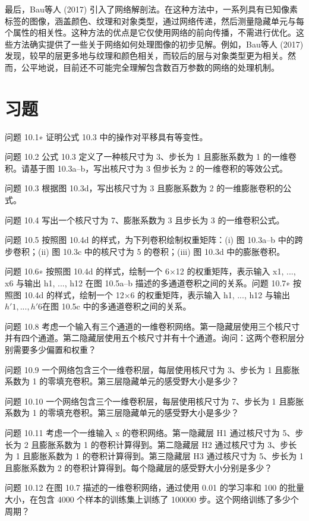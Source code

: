 \documentclass[lang=cn,newtx,10pt,scheme=chinese]{elegantbook}
\begin{document}
最后，Bau等人 (2017) 引入了网络解剖法。在这种方法中，一系列具有已知像素标签的图像，涵盖颜色、纹理和对象类型，通过网络传递，然后测量隐藏单元与每个属性的相关性。这种方法的优点是它仅使用网络的前向传播，不需进行优化。这些方法确实提供了一些关于网络如何处理图像的初步见解。例如，Bau等人 (2017) 发现，较早的层更多地与纹理和颜色相关，而较后的层与对象类型更为相关。然而，公平地说，目前还不可能完全理解包含数百万参数的网络的处理机制。
\section{习题}  
问题 10.1∗ 证明公式 10.3 中的操作对平移具有等变性。

问题 10.2 公式 10.3 定义了一种核尺寸为 3、步长为 1 且膨胀系数为 1 的一维卷积。请基于图 10.3a–b，写出核尺寸为 3 但步长为 2 的一维卷积的等效公式。

问题 10.3 根据图 10.3d，写出核尺寸为 3 且膨胀系数为 2 的一维膨胀卷积的公式。

问题 10.4 写出一个核尺寸为 7、膨胀系数为 3 且步长为 3 的一维卷积公式。

问题 10.5 按照图 10.4d 的样式，为下列卷积绘制权重矩阵：(i) 图 10.3a–b 中的跨步卷积；(ii) 图 10.3c 中的核尺寸为 5 的卷积；(iii) 图 10.3d 中的膨胀卷积。

问题 10.6∗ 按照图 10.4d 的样式，绘制一个 6×12 的权重矩阵，表示输入 x1, ..., x6 与输出 h1, ..., h12 在图 10.5a–b 描述的多通道卷积之间的关系。问题 10.7∗ 按照图 10.4d 的样式，绘制一个 12×6 的权重矩阵，表示输入 h1, ..., h12 与输出 \(h \prime 1,...,h \prime 6 \)在图 10.5c 中的多通道卷积之间的关系。

问题 10.8 考虑一个输入有三个通道的一维卷积网络。第一隐藏层使用三个核尺寸并有四个通道。第二隐藏层使用五个核尺寸并有十个通道。询问：这两个卷积层分别需要多少偏置和权重？

问题 10.9 一个网络包含三个一维卷积层，每层使用核尺寸为 3、步长为 1 且膨胀系数为 1 的零填充卷积。第三层隐藏单元的感受野大小是多少？

问题 10.10 一个网络包含三个一维卷积层，每层使用核尺寸为 7、步长为 1 且膨胀系数为 1 的零填充卷积。第三层隐藏单元的感受野大小是多少？

问题 10.11 考虑一个一维输入 x 的卷积网络。第一隐藏层 H1 通过核尺寸为 5、步长为 2 且膨胀系数为 1 的卷积计算得到。第二隐藏层 H2 通过核尺寸为 3、步长为 1 且膨胀系数为 1 的卷积计算得到。第三隐藏层 H3 通过核尺寸为 5、步长为 1 且膨胀系数为 2 的卷积计算得到。每个隐藏层的感受野大小分别是多少？

问题 10.12 在图 10.7 描述的一维卷积网络，通过使用 0.01 的学习率和 100 的批量大小，在包含 4000 个样本的训练集上训练了 100000 步。这个网络训练了多少个周期？
\end{document}
